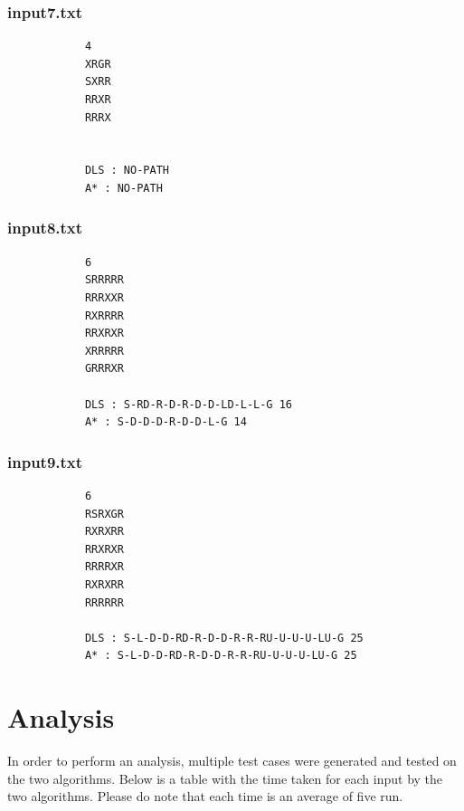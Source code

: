 \documentclass{article}
\begin{document}
		\subsubsection{input7.txt}
	\begin{lstlisting}
			4
			XRGR
			SXRR
			RRXR
			RRRX
			
			
			DLS : NO-PATH
			A* : NO-PATH
	\end{lstlisting}
	
		\subsubsection{input8.txt}
	\begin{lstlisting}
			6
			SRRRRR
			RRRXXR
			RXRRRR
			RRXRXR
			XRRRRR
			GRRRXR
			
			DLS : S-RD-R-D-R-D-D-LD-L-L-G 16
			A* : S-D-D-D-R-D-D-L-G 14
	\end{lstlisting}
	
		\subsubsection{input9.txt}
	\begin{lstlisting}
			6
			RSRXGR
			RXRXRR
			RRXRXR
			RRRRXR
			RXRXRR
			RRRRRR
			
			DLS : S-L-D-D-RD-R-D-D-R-R-RU-U-U-U-LU-G 25
			A* : S-L-D-D-RD-R-D-D-R-R-RU-U-U-U-LU-G 25
	\end{lstlisting}
	
	
	
	\section{Analysis}
	In order to perform an analysis, multiple test cases were generated and tested on the two algorithms. Below is a table with the time taken for each input by the two algorithms. Please do note that each time is an average of five run.
\end{document}
